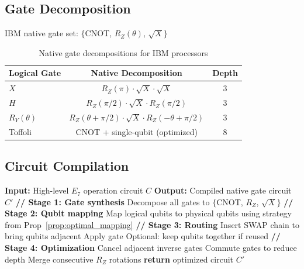 \subsection{Gate Decomposition}

IBM native gate set: $\{$CNOT, $R_Z(\theta)$, $\sqrt{X}\}$

\begin{table}[h]
\centering
\begin{tabular}{lcc}
\toprule
\textbf{Logical Gate} & \textbf{Native Decomposition} & \textbf{Depth} \\
\midrule
$X$ & $R_Z(\pi) \cdot \sqrt{X} \cdot \sqrt{X}$ & 3 \\
$H$ & $R_Z(\pi/2) \cdot \sqrt{X} \cdot R_Z(\pi/2)$ & 3 \\
$R_Y(\theta)$ & $R_Z(\theta+\pi/2) \cdot \sqrt{X} \cdot R_Z(-\theta+\pi/2)$ & 3 \\
Toffoli & CNOT + single-qubit (optimized) & 8 \\
\bottomrule
\end{tabular}
\caption{Native gate decompositions for IBM processors}
\label{tab:native_gates}
\end{table}

\subsection{Circuit Compilation}

\begin{algorithm}[H]
\caption{Compile $E_7$ Encoding Circuit for IBM Hardware}
\label{alg:compile_ibm}
\begin{algorithmic}[1]
\State \textbf{Input:} High-level $E_7$ operation circuit $C$
\State \textbf{Output:} Compiled native gate circuit $C'$
\State
\State \textbf{// Stage 1: Gate synthesis}
\State Decompose all gates to $\{$CNOT, $R_Z$, $\sqrt{X}\}$
\State
\State \textbf{// Stage 2: Qubit mapping}
\State Map logical qubits to physical qubits using strategy from Prop~\ref{prop:optimal_mapping}
\State
\State \textbf{// Stage 3: Routing}
    \State Insert SWAP chain to bring qubits adjacent
    \State Apply gate
    \State Optional: keep qubits together if reused
\EndFor
\State
\State \textbf{// Stage 4: Optimization}
\State Cancel adjacent inverse gates
\State Commute gates to reduce depth
\State Merge consecutive $R_Z$ rotations
\State
\State \textbf{return} optimized circuit $C'$
\end{algorithmic}
\end{algorithm}

